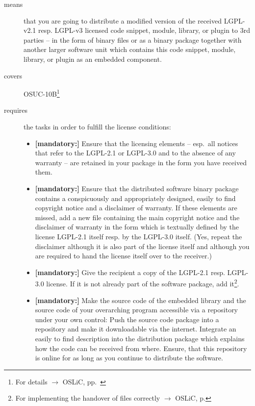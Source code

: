\begin{description}
\item[means] that you are going to distribute a modified version of the received
LGPL-v2.1 resp. LGPL-v3 licensed code snippet, module, library, or plugin to 3rd
parties -- in the form of binary files or as a binary package together with
another larger software unit which contains this code snippet, module, library,
or plugin as an embedded component.
\item[covers] OSUC-10B\footnote{For details $\rightarrow$ OSLiC, pp.\
\pageref{OSUC-10B-DEF}}
\item[requires] the tasks in order to fulfill the license conditions:
\begin{itemize}

  \item \textbf{[mandatory:]} Ensure that the licensing elements -- esp.\ all
  notices that refer to the LGPL-2.1 or LGPL-3.0 and to the absence of any
  warranty -- are retained in your package in the form you have received them.

  \item \textbf{[mandatory:]} Ensure that the distributed software binary
  package contains a conspicuously and appropriately designed, easily to find
  copyright notice and a disclaimer of warranty. If these elements are missed,
  add a new file containing the main copyright notice and the disclaimer of
  warranty in the form which is textually defined by the license LGPL-2.1 itself
  resp. by the LGPL-3.0 itself. (Yes, repeat the disclaimer although it is also
  part of the license itself and although you are required to hand the license
  itself over to the receiver.)
  
  \item \textbf{[mandatory:]} Give the recipient a copy of the LGPL-2.1 resp.
  LGPL-3.0 license. If it is not already part of the software package, add
  it\footnote{For implementing the handover of files correctly $\rightarrow$
  OSLiC, p. \pageref{DistributingFilesHint}}.

  \item \textbf{[mandatory:]} Make the source code of the embedded library and
  the source code of your overarching program accessible via a repository under
  your own control: Push the source code package into a repository and make it
  downloadable via the internet. Integrate an easily to find description into
  the distribution package which explains how the code can be received from
  where. Ensure, that this repository is online for as long as you continue to
  distribute the software.


\end{itemize}
\end{description}
